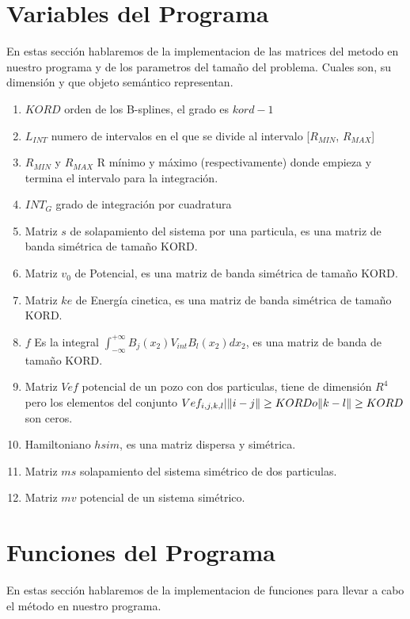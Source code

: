\documentclass[a4paper,openright,12pt, oneside]{book}
\DeclarePairedDelimiter\norm{\lVert}{\rVert}
\begin{document}
\section{Variables del Programa}
En estas secci\'on  hablaremos de la implementacion de las matrices del metodo en nuestro programa y de los parametros del tama\~no del problema. Cuales son, su dimensi\'on y que objeto sem\'antico representan.


\begin{enumerate}
    \item ${KORD}$ orden de los B-splines, el grado es ${kord-1}$
    \item ${L_{INT}}$ numero de intervalos en el que se divide al intervalo [$R_{MIN}$, $R_{MAX}$]
    \item $R_{MIN}$ y $R_{MAX}$ R m\'inimo y m\'aximo (respectivamente) donde empieza y termina el intervalo para la integraci\'on.
    \item ${INT}_G$ grado de integraci\'on por cuadratura
    \item Matriz $s$ de solapamiento del sistema por una particula, es una matriz de banda sim\'etrica de tama\~no KORD.
    \item Matriz $v_0$ de Potencial, es una matriz de banda sim\'etrica de tama\~no KORD.
    \item Matriz $ke$ de Energ\'ia cinetica, es una matriz de banda sim\'etrica de tama\~no KORD.
    \item $f$ Es la integral $\int_{-\infty}^{+\infty} {B_j(x_2) V_{int} B_l(x_2) dx_2}$, es una matriz de banda de tama\~no KORD.
    \item Matriz $Vef$ potencial de un pozo con dos particulas, tiene de dimensi\'on $R^4$ pero los elementos del conjunto ${Vef_{i, j, k, l} | \norm{i - j} \geq KORD o \norm{k - l} \geq KORD}$ son ceros.
    \item Hamiltoniano $hsim$, es una matriz dispersa y sim\'etrica.
    \item Matriz $ms$ solapamiento del sistema sim\'etrico de dos particulas.
    \item Matriz $mv$ potencial de un sistema sim\'etrico.
\end{enumerate}

\section{Funciones del Programa}
En estas secci\'on hablaremos de la implementacion de funciones para llevar a cabo el m\'etodo en nuestro programa.
\end{document}
